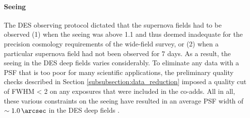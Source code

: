 



\paragraph{Seeing}  The DES observing protocol dictated that the supernova fields had to be observed (1) when the seeing was above \SI{1.1}{\arcsec} and thus deemed inadequate for the precision cosmology requirements of the wide-field survey, or (2) when a particular supernova field had not been observed for 7 days. As a result, the seeing in the DES deep fields varies considerably. To eliminate any data with a PSF that is too poor for many scientific applications, the preliminary quality checks described in Section \ref{subsubsection:data_reduction} imposed a quality cut of FWHM < \SI{2}{\arcsec} on any exposures that were included in the co-adds. All in all, these various constraints on the seeing have resulted in an average PSF width of $\sim \SI{1.0}{\arcsec}$ in the DES deep fields \citep{2015AJ....150..172K}. 


